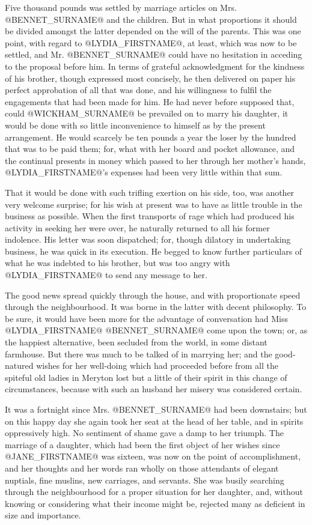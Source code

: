 Five thousand pounds was settled by marriage articles on Mrs. @BENNET_SURNAME@ and
the children. But in what proportions it should be divided amongst the
latter depended on the will of the parents. This was one point, with
regard to @LYDIA_FIRSTNAME@, at least, which was now to be settled, and Mr. @BENNET_SURNAME@
could have no hesitation in acceding to the proposal before him. In
terms of grateful acknowledgment for the kindness of his brother,
though expressed most concisely, he then delivered on paper his perfect
approbation of all that was done, and his willingness to fulfil the
engagements that had been made for him. He had never before supposed
that, could @WICKHAM_SURNAME@ be prevailed on to marry his daughter, it would
be done with so little inconvenience to himself as by the present
arrangement. He would scarcely be ten pounds a year the loser by the
hundred that was to be paid them; for, what with her board and pocket
allowance, and the continual presents in money which passed to her
through her mother's hands, @LYDIA_FIRSTNAME@'s expenses had been very little within
that sum.

That it would be done with such trifling exertion on his side, too, was
another very welcome surprise; for his wish at present was to have as
little trouble in the business as possible. When the first transports
of rage which had produced his activity in seeking her were over, he
naturally returned to all his former indolence. His letter was soon
dispatched; for, though dilatory in undertaking business, he was quick
in its execution. He begged to know further particulars of what he
was indebted to his brother, but was too angry with @LYDIA_FIRSTNAME@ to send any
message to her.

The good news spread quickly through the house, and with proportionate
speed through the neighbourhood. It was borne in the latter with decent
philosophy. To be sure, it would have been more for the advantage
of conversation had Miss @LYDIA_FIRSTNAME@ @BENNET_SURNAME@ come upon the town; or, as the
happiest alternative, been secluded from the world, in some distant
farmhouse. But there was much to be talked of in marrying her; and the
good-natured wishes for her well-doing which had proceeded before from
all the spiteful old ladies in Meryton lost but a little of their spirit
in this change of circumstances, because with such an husband her misery
was considered certain.

It was a fortnight since Mrs. @BENNET_SURNAME@ had been downstairs; but on this
happy day she again took her seat at the head of her table, and in
spirits oppressively high. No sentiment of shame gave a damp to her
triumph. The marriage of a daughter, which had been the first object
of her wishes since @JANE_FIRSTNAME@ was sixteen, was now on the point of
accomplishment, and her thoughts and her words ran wholly on those
attendants of elegant nuptials, fine muslins, new carriages, and
servants. She was busily searching through the neighbourhood for a
proper situation for her daughter, and, without knowing or considering
what their income might be, rejected many as deficient in size and
importance.

